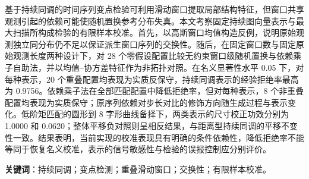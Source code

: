 基于持续同调的时间序列变点检验可利用滑动窗口提取局部结构特征，但窗口共享观测引起的依赖可能使随机置换参考分布失真。本文考察固定持续图向量表示与最大扫描所构成检验的有限样本校准。首先，以高斯窗口均值构造反例，说明原始观测独立同分布仍不足以保证派生窗口序列的交换性。随后，在固定窗口数与固定原始观测长度两种设计下，对 28 个零假设配置比较无约束窗口级随机置换与依赖乘子自助法，并以均值--协方差特征作为非拓扑对照。在名义显著性水平 0.05 下，对每种表示，20 个重叠配置均表现为实质反保守，持续同调表示的经验拒绝率最高为 0.9756。依赖乘子法在全部匹配配置中降低拒绝率，但对每种表示，8 个非重叠配置均表现为实质保守；原序列依赖对步长对比的修饰方向随生成过程与表示变化。低阶矩匹配的圆形到 8 字形曲线备择下，两类表示的尺寸校正功效分别为 1.0000 和 0.0620；整体平移负对照则呈相反结果，与距离型持续同调的平移不变性一致。结果表明，当前实现的校准表现具有明确的条件依赖性，降低拒绝率不能等同于恢复名义校准，表示的信号敏感性与检验的误报控制应分别评价。

\noindent\textbf{关键词}：持续同调；变点检测；重叠滑动窗口；交换性；有限样本校准。
